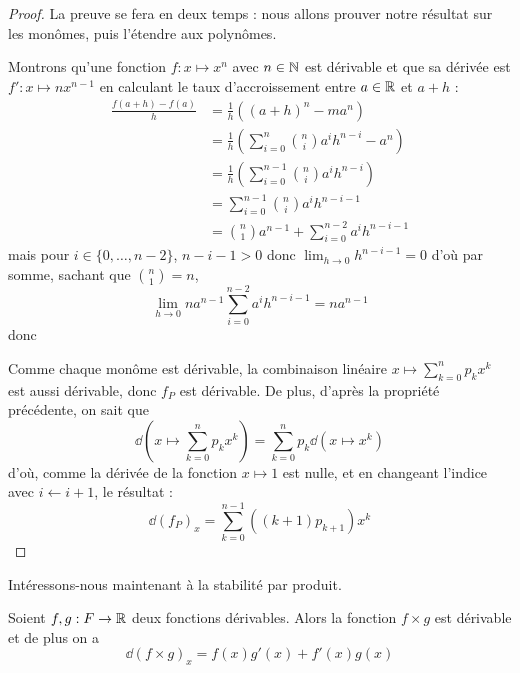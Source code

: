 \begin{proof}
    La preuve se fera en deux temps : nous allons prouver notre résultat sur les monômes, puis l'étendre aux polynômes.

    Montrons qu'une fonction $f : x \mapsto x^n$ avec $n\in\mathbb{N}$ est dérivable et que sa dérivée est $f' : x \mapsto n x^{n-1}$ en calculant le taux d'accroissement entre $a\in \mathbb{R}$ et $a+h$ :
    \begin{align*}
        \displaystyle{\frac{f(a+h)-f(a)}{h}} &= \frac{1}{h} ((a+h)^n - ma^n)\\
        &= \frac{1}{h} \left(\sum_{i = 0}^n \binom{n}{i} a^i h^{n-i} - a^n\right)\\
        &= \frac{1}{h} \left(\sum_{i = 0}^{n-1} \binom{n}{i} a^i h^{n-i}\right)\\
        &= \sum_{i=0}^{n-1} \binom{n}{i} a^i h^{n-i-1}\\
        &= \binom{n}{1} a^{n-1} + \sum_{i=0}^{n-2} a^i h^{n-i-1}
    \end{align*}
    mais pour $i\in\{0,\ldots,n-2\}$, $n-i-1 > 0$ donc $ \displaystyle{\lim_{h\to 0}h^{n-i-1} = 0}$ d'où par somme, sachant que $\displaystyle{\binom{n}{1}=n}$, $$\lim_{h\to 0} n a^{n-1} \sum_{i=0}^{n-2} a^i h^{n-i-1} = n a^{n-1}$$ donc 

    Comme chaque monôme est dérivable, la combinaison linéaire $x\mapsto \displaystyle\sum_{k=0}^n p_k x^k$ est aussi dérivable, donc $f_P$ est dérivable. De plus, d'après la propriété précédente, on sait que $$\dd(x\mapsto \sum_{k=0}^n p_k x^k) = \sum_{k=0}^n p_k \dd(x\mapsto x^k)$$ d'où, comme la dérivée de la fonction $x\mapsto 1$ est nulle, et en changeant l'indice avec $i \leftarrow i+1$, le résultat : $$\boxed{\dd (f_P)_x = \sum_{k= 0}^{n-1} ((k+1)p_{k+1})x^k}$$
\end{proof}

Intéressons-nous maintenant à la stabilité par produit.

\begin{prop}
    Soient $f,g : F \to \mathbb{R}$ deux fonctions dérivables. Alors la fonction $f\times g$ est dérivable et de plus on a $$\dd (f\times g)_x = f(x)g'(x) + f'(x)g(x)$$
\end{prop}

